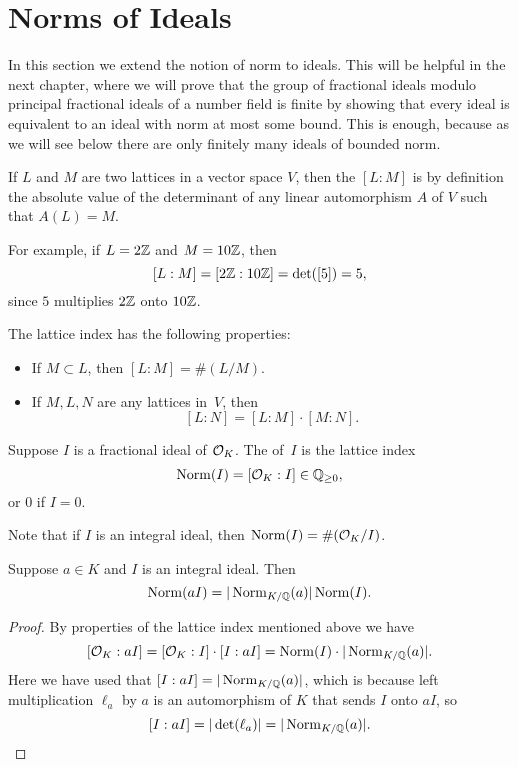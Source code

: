 \section{Norms of Ideals}
In this section we extend the notion of norm to ideals.  This will be
helpful in the next chapter, where
we will prove that the group of fractional ideals modulo principal
fractional ideals of a number field is finite by showing that every
ideal is equivalent to an ideal with norm at most some bound.
This is enough, because as we will see below there are only
finitely many ideals of bounded norm.
\begin{definition}
If $L$ and $M$ are two lattices in a vector space $V$, then the 
 $[L:M]$ is by definition the absolute value of the
determinant of any linear automorphism $A$ of $V$ such that $A(L)=M$.
\end{definition}
For example, if $L=2\mathbb{Z}$ and $M=10\mathbb{Z}$, then 
$$
  [L:M] = [2\mathbb{Z} : 10\mathbb{Z}] = \det([5]) = 5,
$$
since $5$ multiplies $2\mathbb{Z}$ onto $10\mathbb{Z}$.

The lattice index has the
following properties: 
\begin{itemize}
\item If $M\subset L$, then $[L:M]=\#(L/M)$.
\item If $M, L, N$ are any lattices in~$V$, 
then $$[L:N] = [L:M]\cdot [M:N].$$
\end{itemize}


\begin{definition}
Suppose $I$ is a fractional ideal of $\mathcal{O}_K$.  The  of~$I$ is
the lattice index
$$ 
  \operatorname{Norm}(I) = [\mathcal{O}_K : I] \in \mathbb{Q}_{\geq 0},
$$ 
or $0$ if $I=0$.
\end{definition}
Note that if $I$ is an integral ideal, then $\operatorname{Norm}(I)=\#(\mathcal{O}_K/I)$.

\begin{lemma}\label{lem:aIfrac}
Suppose $a\in K$ and $I$ is an integral ideal.
Then 
\[
  \operatorname{Norm}(a I) = |\operatorname{Norm}_{K/\mathbb{Q}}(a)| \operatorname{Norm}(I).
\]
\end{lemma}
\begin{proof}
By properties of the lattice index mentioned above we have
\[
 [\mathcal{O}_K : aI] = [\mathcal{O}_K : I] \cdot [I:aI]
             = \operatorname{Norm}(I) \cdot |\operatorname{Norm}_{K/\mathbb{Q}}(a)|.
\] 
Here we have used that $[I:aI]=|\operatorname{Norm}_{K/\mathbb{Q}}(a)|$, which is because left
multiplication $\ell_a$ by $a$ is an automorphism of $K$ that sends $I$ onto
$aI$, so $$[I:aI]=|\det(\ell_a)|=|\operatorname{Norm}_{K/\mathbb{Q}}(a)|.$$
\end{proof}

